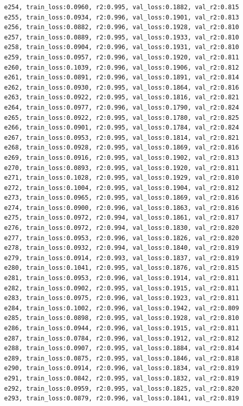 \documentclass[a4paper, 12pt]{article}
\begin{document}
\begin{lstlisting}
e254, train_loss:0.0960, r2:0.995, val_loss:0.1882, val_r2:0.815
e255, train_loss:0.0934, r2:0.996, val_loss:0.1901, val_r2:0.813
e256, train_loss:0.0882, r2:0.996, val_loss:0.1928, val_r2:0.810
e257, train_loss:0.0889, r2:0.995, val_loss:0.1933, val_r2:0.810
e258, train_loss:0.0904, r2:0.996, val_loss:0.1931, val_r2:0.810
e259, train_loss:0.0957, r2:0.996, val_loss:0.1920, val_r2:0.811
e260, train_loss:0.1039, r2:0.996, val_loss:0.1906, val_r2:0.812
e261, train_loss:0.0891, r2:0.996, val_loss:0.1891, val_r2:0.814
e262, train_loss:0.0930, r2:0.995, val_loss:0.1864, val_r2:0.816
e263, train_loss:0.0922, r2:0.995, val_loss:0.1816, val_r2:0.821
e264, train_loss:0.0977, r2:0.996, val_loss:0.1790, val_r2:0.824
e265, train_loss:0.0922, r2:0.995, val_loss:0.1780, val_r2:0.825
e266, train_loss:0.0901, r2:0.995, val_loss:0.1784, val_r2:0.824
e267, train_loss:0.0953, r2:0.995, val_loss:0.1814, val_r2:0.821
e268, train_loss:0.0928, r2:0.995, val_loss:0.1869, val_r2:0.816
e269, train_loss:0.0916, r2:0.995, val_loss:0.1902, val_r2:0.813
e270, train_loss:0.0893, r2:0.995, val_loss:0.1920, val_r2:0.811
e271, train_loss:0.1028, r2:0.995, val_loss:0.1929, val_r2:0.810
e272, train_loss:0.1004, r2:0.995, val_loss:0.1904, val_r2:0.812
e273, train_loss:0.0965, r2:0.995, val_loss:0.1869, val_r2:0.816
e274, train_loss:0.0900, r2:0.996, val_loss:0.1863, val_r2:0.816
e275, train_loss:0.0972, r2:0.994, val_loss:0.1861, val_r2:0.817
e276, train_loss:0.0972, r2:0.994, val_loss:0.1830, val_r2:0.820
e277, train_loss:0.0953, r2:0.996, val_loss:0.1826, val_r2:0.820
e278, train_loss:0.0932, r2:0.994, val_loss:0.1840, val_r2:0.819
e279, train_loss:0.0914, r2:0.993, val_loss:0.1837, val_r2:0.819
e280, train_loss:0.1041, r2:0.995, val_loss:0.1876, val_r2:0.815
e281, train_loss:0.0953, r2:0.996, val_loss:0.1914, val_r2:0.811
e282, train_loss:0.0902, r2:0.995, val_loss:0.1915, val_r2:0.811
e283, train_loss:0.0975, r2:0.996, val_loss:0.1923, val_r2:0.811
e284, train_loss:0.1002, r2:0.996, val_loss:0.1942, val_r2:0.809
e285, train_loss:0.0898, r2:0.995, val_loss:0.1928, val_r2:0.810
e286, train_loss:0.0944, r2:0.996, val_loss:0.1915, val_r2:0.811
e287, train_loss:0.0784, r2:0.996, val_loss:0.1912, val_r2:0.812
e288, train_loss:0.0907, r2:0.995, val_loss:0.1884, val_r2:0.814
e289, train_loss:0.0875, r2:0.995, val_loss:0.1846, val_r2:0.818
e290, train_loss:0.0914, r2:0.996, val_loss:0.1834, val_r2:0.819
e291, train_loss:0.0842, r2:0.995, val_loss:0.1832, val_r2:0.819
e292, train_loss:0.0959, r2:0.995, val_loss:0.1825, val_r2:0.820
e293, train_loss:0.0879, r2:0.996, val_loss:0.1841, val_r2:0.819

\end{lstlisting}
\end{document}
